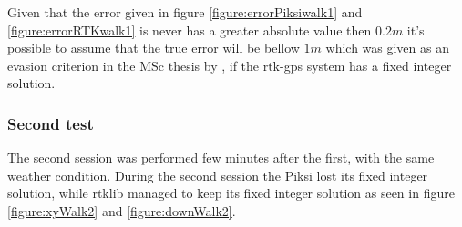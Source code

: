 Given that the error given in figure \ref{figure:errorPiksiwalk1} and \ref{figure:errorRTKwalk1} is never has a greater absolute value then $0.2m$ it's possible to assume that the true error will be bellow $1m$ which was given as an evasion criterion in the MSc thesis by \citep{Froelich}, if the \gls{rtk-gps} system has a fixed integer solution.
\subsubsection{Second test}
The second session was performed few minutes after the first, with the same weather condition.
During the second session the Piksi lost its fixed integer solution, while \gls{rtklib} managed to keep its fixed integer solution as seen in figure \ref{figure:xyWalk2} and \ref{figure:downWalk2}.

